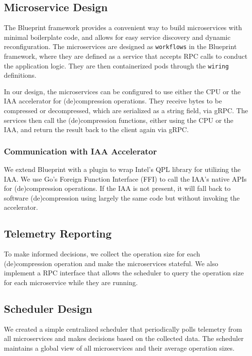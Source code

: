 \subsection{Microservice Design}

The Blueprint framework provides a convenient way to build microservices with minimal boilerplate code, and allows for easy service discovery and dynamic reconfiguration.
The microservices are designed as \texttt{workflows} in the Blueprint framework, where they are defined as a service that accepts RPC calls to conduct the application logic.
They are then containerized pods through the \texttt{wiring} definitions.

In our design, the microservices can be configured to use either the CPU or the IAA accelerator for (de)compression operations.
They receive bytes to be compressed or decompressed, which are serialized as a string field, via gRPC.
The services then call the (de)compression functions, either using the CPU or the IAA, and return the result back to the client again via gRPC.

\subsubsection{Communication with IAA Accelerator}

We extend Blueprint with a plugin to wrap Intel's QPL library \cite{intelIntelQpl2025} for utilizing the IAA.
We use Go's Foreign Function Interface (FFI) to call the IAA's native APIs for (de)compression operations.
If the IAA is not present, it will fall back to software (de)compression using largely the same code but without invoking the accelerator.

\subsection{Telemetry Reporting}

To make informed decisions, we collect the operation size for each (de)compression operation and make the microservices stateful.
We also implement a RPC interface that allows the scheduler to query the operation size for each microservice while they are running.

\subsection{Scheduler Design}

We created a simple centralized scheduler that periodically polls telemetry from all microservices and makes decisions based on the collected data.
The scheduler maintains a global view of all microservices and their average operation sizes.

